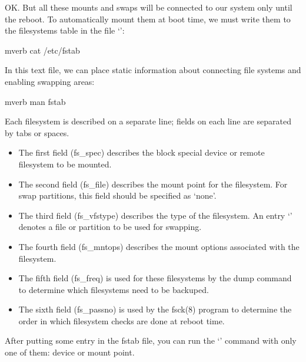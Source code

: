 OK. But all these mounts and swaps will be connected to our system only
until the reboot. To automatically mount them at boot time, we must write
them to the filesystems table in the file `':
\begin{code}{mverb}
cat /etc/fstab
\end{code}
In this text file, we can place static information about connecting file
systems and enabling swapping areas:
\begin{code}{mverb}
man fstab
\end{code}

Each  filesystem  is  described on a separate line; fields on each line
are separated by tabs or spaces.

\begin{itemize}
\item The first field (fs\_spec) describes the block special device or
      remote filesystem to be mounted.
\item The second field (fs\_file) describes the mount point for the filesystem.
      For swap partitions, this field should be specified as `none'.
\item The third field (fs\_vfstype) describes the type of the filesystem.
      An entry `' denotes a file or partition to be used
      for swapping.
\item The fourth field (fs\_mntops) describes the mount options associated
      with the filesystem.
\item The fifth field (fs\_freq) is used for these filesystems by the dump
      command to determine which filesystems need to be backuped.
\item The sixth field (fs\_passno) is used by the fsck(8) program to determine
      the order in which filesystem checks are done at reboot time.
\end{itemize}

After putting some entry in the fstab file, you can run the `'
command with only one of them: device or mount point.
